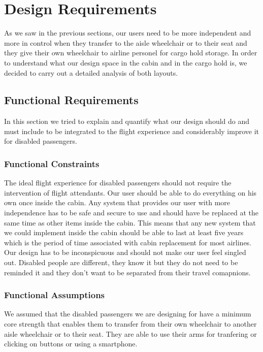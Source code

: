 \chapter{Design Requirements}

As we saw in the previous sections, our users need to be more independent and more in control when they transfer to the aisle wheelchair or to their seat and they give their own wheelchair to airline personel for cargo hold storage. In order to understand what our design space in the cabin and in the cargo hold is, we decided to carry out a detailed analysis of both layouts.

\section{Functional Requirements}

In this section we tried to explain and quantify what our design should do and must include to be integrated to the flight experience and considerably improve it for disabled passengers.

\subsection{Functional Constraints}

The ideal flight experience for disabled passengers should not require the intervention of flight attendants. Our user should be able to do everything on his own once inside the cabin. Any system that provides our user with more independence has to be safe and secure to use and should have be replaced at the same time as other items inside the cabin. This means that any new system that we could implement inside the cabin should be able to last at least five years which is the period of time associated with cabin replacement for most airlines.
Our design has to be inconspicuous and should not make our user feel singled out. Disabled people are different, they know it but they do not need to be reminded it and they don't want to be separated from their travel comapnions.

\subsection{Functional Assumptions}

We assumed that the disabled passengers we are designing for have a minimum core strength that enables them to transfer from their own wheelchair to another aisle wheelchair or to their seat. They are able to use their arms for tranfering or clicking on buttons or using a smartphone.

